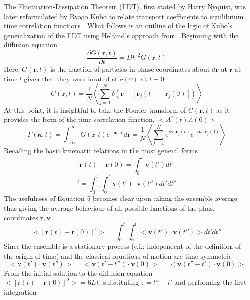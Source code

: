 \documentclass[aps,prb,preprint,preprintnumbers,amsmath,amssymb,floatfix,superscriptaddress]{revtex4}
\begin{document}
The Fluctuation-Dissipation Theorem (FDT), first stated by Harry Nyquist, was later reformulated by Ryogo Kubo to relate transport coefficients to equilibrium time correlation functions \cite{JPSJ.12.570}. What follows is an outline of the logic of Kubo's generalization of the FDT using Helfand's approach from \cite{mcquarrie}. Beginning with the diffusion equation
%
\begin{equation}
\frac{\partial G(\pmb{r},t)}{\partial t}= D \nabla ^2G(\pmb{r},t)
\end{equation}
%
Here, $G(\pmb{r},t)$ is the fraction of particles in phase coordinates about $d\pmb{r}$ at $\pmb{r}$ at time $t$ given that they were located at $\pmb{r}(0)$ at $t=0$
%
\begin{equation}
G(\pmb{r},t)= \frac{1}{N}\left<\sum_{j=1}^N\delta(\pmb{r}-[\pmb{r}_j(t)-\pmb{r}_j(0)])\right>
\end{equation}
%
At this point, it is insightful to take the Fourier transform of $G(\pmb{r},t)$ as it provides the form of the time correlation function, $<A^*(t)A(0)>$
%
\begin{equation}
F(\pmb{\kappa},t)=\int_{-\infty}^{\infty}G(\pmb{r},t)e^{-i\pmb{\kappa}\cdot\pmb{r}}d\pmb{r}=\frac{1}{N}\left<\sum_{j=1}^Ne^{i\pmb{\kappa}\cdot\pmb{r}_j(t)}e^{-i\pmb{\kappa}\cdot\pmb{r}_j(0)}\right>
\end{equation}
%
Recalling the basic kinematic relations in the most general forms
%
\begin{equation}
\pmb{r}(t)-\pmb{r}(0)=\int_0^t \pmb{v}(t')dt'
\end{equation}
\begin{equation}
[\pmb{r}(t)-\pmb{r}(0)]^2=\int_0^t \int_0^t \pmb{v}(t')\cdot\pmb{v}(t'')dt'dt''
\end{equation}
%
The usefulness of Equation 5 becomes clear upon taking the ensemble average thus giving the average behaviour of all possible functions of the phase coordinates $\pmb{r},\pmb{v}$
%
\begin{equation}
<[\pmb{r}(t)-\pmb{r}(0)]^2>=\int_0^t \int_0^t <\pmb{v}(t')\cdot\pmb{v}(t'')>dt'dt''
\end{equation}
%
Since the ensemble is a stationary process (e.i.: independent of the definition of the origin of time) and the classical equations of motion are time-symmetric
%
\begin{equation}
<\pmb{v}(t')\cdot\pmb{v}(t'')>=<\pmb{v}(t'-t'')\cdot\pmb{v}(0)>=<\pmb{v}(t''-t')\cdot\pmb{v}(0)>
\end{equation}
%
From the initial solution to the diffusion equation $<[\pmb{r}(t)-\pmb{r}(0)]^2>=6Dt$, substituting $\tau=t''-t'$ and performing the first integration
\end{document}
